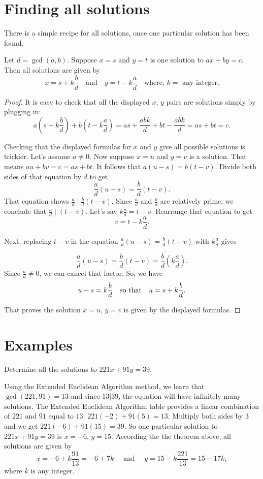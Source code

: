 \section{Finding all solutions}\label{sec:find all lin combs}
There is a simple recipe for all solutions, once one particular
solution has been found. 

\begin{thm}
 Let $d = \gcd(a,b)$. Suppose $x=s$ and $y=t$
 is one solution to $ax+by=c$. Then all solutions are given by
 \[
 x = s + k\frac{b}{d}\quad\text{and}\quad y = t - k\frac{a}{d}\quad
 \text{where, }  k=\text{ any integer}.
 \] 
\end{thm}
\begin{proof}
It is easy to check that all the displayed $x$, $y$
pairs are solutions simply by plugging in:
\[
a\left(s+k\frac{b}{d}\right)+ b
\left(t-k\frac{a}{d}\right) = as+\frac{abk}{d} +bt -\frac{abk}{d}
= as+bt = c.
\]

Checking that the displayed formulas for $x$ and $y$ give all
possible solutions is trickier. Let's assume $a\not= 0$.
Now suppose $x=u$ and $y = v$ is a solution.
That means $au+bv = c = as+bt$. It follows that $a(u-s) = b(t-v)$.
Divide both sides of that equation by $d$ to get
\[
\frac{a}{d}(u-s) = \frac{b}{d}(t-v).
\]
That equation shows 
$\displaystyle \frac{a}{d}{\;\biggl|\;}\frac{b}{d}(t-v)$.  %
Since $\displaystyle \frac{a}{d}$ and $\displaystyle \frac{b}{d}$ are relatively prime, we
conclude that
 $\displaystyle \frac{a}{d}{\;\biggl|\;} (t-v)$. Let's say
$\displaystyle k\frac{a}{d} = t-v$. Rearrange that equation to get
\[
v = t - k\frac{a}{d}.
\]

Next, replacing  $t-v$ in the equation  
$\displaystyle \frac{a}{d}(u-s) = \frac{b}{d}(t-v)$ with $\displaystyle k\frac{a}{d}$ gives

\[
\frac{a}{d}(u-s) = \frac{b}{d}(t-v) = \frac{b}{d}\left(k\frac{a}{d}\right).
\]
Since $\displaystyle \frac{a}{d}\not= 0$, we can cancel that factor. So, we have
\[
u-s = k\frac{b}{d}\quad \hbox {so that}\quad u = s+k\frac{b}{d}.
\]

That proves the solution $x=u$, $y=v$ is given by the displayed
formulas.
\end{proof}

\section{Examples}
\begin{exmp}
Determine all the solutions to $221x+91y = 39$.

Using the Extended Euclidean Algorithm method, we learn that $\gcd(221,91) = 13$
and since $13|39$, the equation will have infinitely many solutions.
The Extended Euclidean Algorithm table provides a linear combination of
$221$ and $91$ equal to $13$:  $221(-2) + 91(5) = 13$. Multiply
both sides by $3$ and we get $221(-6) + 91(15) = 39$. So
one particular solution to $221x+91y = 39$ is $x=-6$, $y=15$.
According the the theorem above, all solutions are given by
\[
x = -6 + k{\frac{91}{13}} = -6+7k
\quad\text{ and }\quad
y = 15-k{\frac{221}{13}} = 15-17k,
\]
where $k$ is any integer.
\end{exmp}

